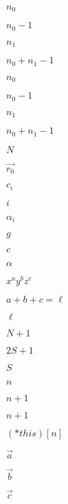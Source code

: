 \documentclass{article}
\begin{document}
$n_0$
\pagebreak

$n_0 -1$
\pagebreak

$n_1$
\pagebreak

$n_0 + n_1 - 1$
\pagebreak

$n_{0}$
\pagebreak

$n_{0} -1$
\pagebreak

$n_{1}$
\pagebreak

$n_0 + n_1 -1$
\pagebreak

$N$
\pagebreak

$\vec{r_0}$
\pagebreak

$c_i$
\pagebreak

$i$
\pagebreak

$\alpha_i$
\pagebreak

$g$
\pagebreak

$c$
\pagebreak

$\alpha$
\pagebreak

$x^ay^bz^c$
\pagebreak

$a+b+c = \ell$
\pagebreak

$\ell$
\pagebreak

$N+1$
\pagebreak

$2S+1$
\pagebreak

$S$
\pagebreak

$n$
\pagebreak

$n + 1 $
\pagebreak

$n + 1$
\pagebreak

$(*this)[n]$
\pagebreak

$\vec{a}$
\pagebreak

$\vec{b}$
\pagebreak

$\vec{c}$
\pagebreak
\end{document}
